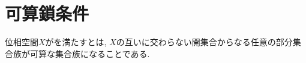 \documentclass[uplatex, dvipdfmx, a4paper, 12pt, class=jsbook, crop=false]{standalone}
\begin{document}
\section{可算鎖条件}
\label{sec:countable-chain-condition}

\begin{definition}
	位相空間$ X $がを満たすとは,
	$ X $の互いに交わらない開集合からなる任意の部分集合族が可算な集合族になることである.
\end{definition}
\end{document}
